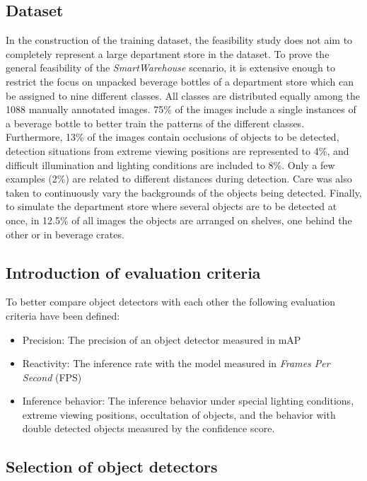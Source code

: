 \documentclass[a4paper, 10pt, journal]{wissarbIEEE}      %
\begin{document}
\subsection{Dataset}

In the construction of the training dataset, the feasibility study does not aim to completely represent a large department store in the dataset. To prove the general feasibility of the \textit{SmartWarehouse} scenario, it is extensive enough to restrict the focus on unpacked beverage bottles of a department store which can be assigned to nine different classes. All classes are distributed equally among the 1088 manually annotated images. 75\% of the images include a single instances of a beverage bottle to better train the patterns of the different classes. Furthermore, 13\% of the images contain occlusions of objects to be detected, detection situations from extreme viewing positions are represented to 4\%, and difficult illumination and lighting conditions are included to 8\%. Only a few examples (2\%) are related to different distances during detection. Care was also taken to continuously vary the backgrounds of the objects being detected. Finally, to simulate the department store where several objects are to be detected at once, in 12.5\% of all images the objects are arranged on shelves, one behind the other or in beverage crates. 

\subsection{Introduction of evaluation criteria}

To better compare object detectors with each other the following evaluation criteria have been defined:

\begin{itemize}
	\item Precision: The precision of an object detector measured in mAP
	\item Reactivity: The inference rate with the model measured in \textit{Frames Per Second} (FPS)
	\item Inference behavior: The inference behavior under special lighting conditions, extreme viewing positions, occultation of objects, and the behavior with double detected objects measured by the confidence score. 
\end{itemize}

\subsection{Selection of object detectors}
\end{document}

